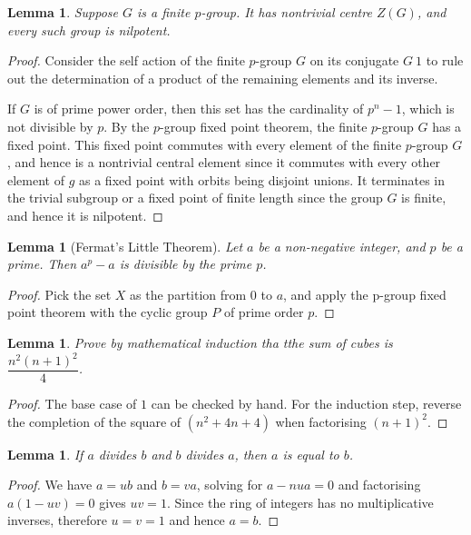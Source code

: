 \documentclass[10pt,twocolumn]{article}
\newtheorem{lemma}[theorem]{Lemma}
\begin{document}
\begin{lemma}
    Suppose $G$ is a finite $p$-group. It has nontrivial centre $Z(G)$, and every such group is nilpotent.
\end{lemma}

\begin{proof}
    Consider the self action of the finite $p$-group $G$ on its conjugate $G \ {1}$ to rule out the determination of a product of the remaining elements and its inverse.

    If $G$ is of prime power order, then this set has the cardinality of $p^n - 1$, which is not divisible by $p$. By the $p$-group fixed point theorem, the finite $p$-group $G$ has a fixed point. This fixed point commutes with every element of the finite $p$-group $G$, and hence is a nontrivial central element since it commutes with every other element of $g$ as a fixed point with orbits being disjoint unions. It terminates in the trivial subgroup or a fixed point of finite length since the group $G$ is finite, and hence it is nilpotent.
\end{proof}

\begin{lemma}[Fermat's Little Theorem]
    Let $a$ be a non-negative integer, and $p$ be a prime.
    Then $a^p - a$ is divisible by the prime $p$. 
\end{lemma}

\begin{proof}
    Pick the set $X$ as the partition from $0$ to $a$, and apply the p-group fixed point theorem with the cyclic group $P$ of prime order $p$.
\end{proof}

\begin{lemma}
Prove by mathematical induction tha tthe sum of cubes is $\dfrac{n^2(n+1)^2}{4}$.
\end{lemma}

\begin{proof}
    The base case of $1$ can be checked by hand.
    For the induction step, reverse the completion of the square of $(n^2 + 4n + 4)$ when factorising $(n + 1)^2$.
\end{proof}

\begin{lemma}
    If $a$ divides $b$ and $b$ divides $a$, then $a$ is equal to $b$. 
\end{lemma}

\begin{proof}
    We have $a = ub$ and $b = va$, solving for $a - nua = 0$ and factorising $a(1 - uv) = 0$ gives $uv = 1$. Since the ring of integers has no multiplicative inverses, therefore $u = v = 1$ and hence $a = b$.
\end{proof}
\end{document}
